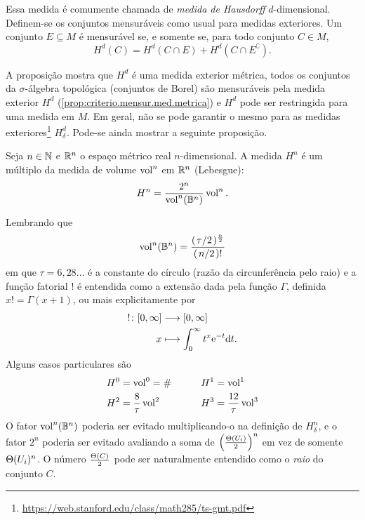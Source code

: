 Essa medida é comumente chamada de \emph{medida de Hausdorff} $d$-dimensional. Definem-se os conjuntos mensuráveis como usual para medidas exteriores. Um conjunto $E \subseteq M$ é mensurável se, e somente se, para todo conjunto $C \in M$,
	\begin{equation*}
	H^d(C) = H^d(C \cap E) + H^d(C \cap E^\complement).
	\end{equation*}

A proposição mostra que $H^d$ é uma medida exterior métrica, todos os conjuntos da $\sigma$-álgebra topológica (conjuntos de Borel) são mensuráveis pela medida exterior $H^d$ (\ref{prop:criterio.mensur.med.metrica}) e $H^d$ pode ser restringida para uma medida em $M$. Em geral, não se pode garantir o mesmo para as medidas exteriores\footnote{\url{https://web.stanford.edu/class/math285/ts-gmt.pdf}} $H^d_\delta$. Pode-se ainda mostrar a seguinte proposição.

\begin{proposition}
Seja $n \in \mathbb{N}$ e $\mathbb{R}^n$ o espaço métrico real $n$-dimensional. A medida $H^n$ é um múltiplo da medida de volume  $\operatorname{vol}^n$ em $\mathbb{R}^n$ (Lebesgue):
	\begin{equation*}
	H^n = \frac{2^n}{\operatorname{vol}^n(\mathbb B^n)}\operatorname{vol}^n.
	\end{equation*}
\end{proposition}

Lembrando que
	\begin{equation*}
	\vol^n(\mathbb B^n) = \frac{(\quo{\tau}{2})^{\frac{n}{2}}}{\left( \quo{n}{2} \right)!}
	\end{equation*}
em que $\tau = 6,28\ldots$ é a constante do círculo (razão da circunferência pelo raio) e a função fatorial $!$ é entendida como a extensão dada pela função $\Gamma$, definida $x! = \Gamma(x+1)$, ou mais explicitamente por
	\begin{align*}
	{!}\colon {\left[{0},{\infty}\right]} &\longrightarrow {\left[{0},{\infty}\right]} \\{x} &\longmapsto \int_0^\infty t^x \mathrm{e}^{-t} \mathrm{d} t.
	\end{align*}
Alguns casos particulares são
	\begin{align*}
	H^0 &= \operatorname{vol}^0 = \# &&\qquad	H^1 = \operatorname{vol}^1 \\
	H^2 &= \frac{8}{\tau}\operatorname{vol}^2 &&\qquad H^3 = \frac{12}{\tau}\operatorname{vol}^3
	\end{align*}
O fator $\operatorname{vol}^n(\mathbb{B}^n)$ poderia ser evitado multiplicando-o na definição de $H^n_\delta$, e o fator $2^n$ poderia ser evitado avaliando a soma de $\left (\frac{\Theta(U_i)}{2}\right )^n$ em vez de somente $\Theta(U_i)^n$. O número $\frac{\Theta(C)}{2}$ pode ser naturalmente entendido como o \emph{raio} do conjunto $C$.

